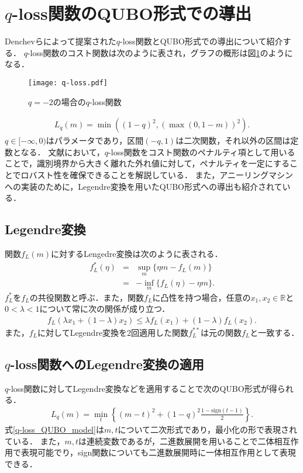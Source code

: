 \documentclass[technicalreport]{ieicej}
\begin{document}
\section{$q$-loss関数のQUBO形式での導出}
Denchevらによって提案された$q$-loss関数とQUBO形式での導出について紹介する．
$q$-loss関数のコスト関数は次のように表され，グラフの概形は図\ref{fig:q-loss}のようになる．
\begin{figure}[t]
  \begin{center}
    \vspace{-20mm}
    \texttt{[image: q-loss.pdf]}
    \vspace{-20mm}
    \caption{$q=-2$の場合の$q$-loss関数}
    \label{fig:q-loss}
  \end{center}
\end{figure}
\begin{eqnarray}
  L_{q}(m)=\min{\left((1-q)^{2},(\max{(0,1-m)})^{2}\right)}. \label{q-loss_cost_function}
\end{eqnarray}
$q\in [-\infty ,0)$はパラメータであり，区間$(-q,1)$は二次関数，それ以外の区間は定数となる．
文献\cite{q-loss_formulation}において，$q$-loss関数をコスト関数のペナルティ項として用いることで，識別境界から大きく離れた外れ値に対して，ペナルティを一定にすることでロバスト性を確保できることを解説している．
また，アニーリングマシンへの実装のために，Legendre変換を用いたQUBO形式への導出も紹介されている．

\subsection{Legendre変換}
関数$f_{L}(m)$に対するLengedre変換は次のように表される．
\begin{eqnarray}
  f^{*}_{L}(\eta)&=&\sup_{m}{\{\eta m-f_{L}(m)\}} \nonumber \\
  &=& -\inf_{m}{\{f_{L}(\eta)-\eta m\}}.
\end{eqnarray}
$f^{*}_{L}$を$f_{L}$の共役関数と呼ぶ．また，関数$f_{L}$に凸性を持つ場合，任意の$x_{1},x_{2}\in\mathbb{R}$と$0<\lambda <1$について常に次の関係が成り立つ．
\begin{eqnarray}
  f_{L}(\lambda x_{1}+(1-\lambda)x_{2})\leq\lambda f_{L}(x_{1})+(1-\lambda)f_{L}(x_{2}).
\end{eqnarray}
また，$f_{L}$に対してLegendre変換を2回適用した関数$f^{**}_{L}$は元の関数$f_{L}$と一致する．

\subsection{$q$-loss関数へのLegendre変換の適用}
$q$-loss関数に対してLegendre変換などを適用することで次のQUBO形式が得られる．
\begin{eqnarray}
  L_{q}(m)=\min_{t}{\left\{(m-t)^{2}+(1-q)^{2}\frac{1-\textrm{sign}(t-1)}{2}\right\}}. \label{q-loss_QUBO_model}
\end{eqnarray}
式\ref{q-loss_QUBO_model}は$m,t$について二次形式であり，最小化の形で表現されている．
また，$m,t$は連続変数であるが，二進数展開を用いることで二体相互作用で表現可能でり，sign関数についても二進数展開時に一体相互作用として表現できる．
\end{document}
